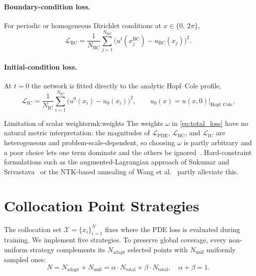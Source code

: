 \paragraph{Boundary-condition loss.}
For periodic or homogeneous Dirichlet conditions at $x \in \{0,\,2\pi\}$,
\[
  \mathcal{L}_\text{BC}
  = \frac{1}{N_\text{BC}}\sum_{j=1}^{N_\text{BC}}
    \bigl(u^t(x_j^\text{BC}) - u_\text{BC}(x_j)\bigr)^2 .
\]

\paragraph{Initial-condition loss.}
At $t=0$ the network is fitted directly to the analytic Hopf--Cole profile,
\[
  \mathcal{L}_\text{IC}
  = \frac{1}{N_\text{IC}}\sum_{i=1}^{N_\text{IC}}
    \bigl(u^0(x_i) - u_0(x_i)\bigr)^2,
  \qquad u_0(x) = u(x,0)\big|_{\text{Hopf--Cole}} .
\]

\begin{Rmk}{Limitation of scalar weights}{rmk:weights}
  The weights $\omega$ in \eqref{eq:total_loss} have no natural metric
  interpretation: the magnitudes of $\mathcal{L}_\text{PDE}$,
  $\mathcal{L}_\text{BC}$, and $\mathcal{L}_\text{IC}$ are heterogeneous and
  problem-scale-dependent, so choosing $\omega$ is partly arbitrary and a poor
  choice lets one term dominate and the others be ignored~\cite{Wang2021}.
  Hard-constraint formulations such as the augmented-Lagrangian approach of
  Sukumar and Srivastava~\cite{Sukumar2022} or the NTK-based annealing of Wang
  et al.~\cite{Wang2021} partly alleviate this.
\end{Rmk}

\section{Collocation Point Strategies}

The collocation set $\mathcal{X} = \{x_i\}_{i=1}^{N}$ fixes where the PDE loss
is evaluated during training. We implement five strategies. To preserve global
coverage, every non-uniform strategy complements its $N_\text{adapt}$ selected
points with $N_\text{unif}$ uniformly sampled ones:
\begin{equation}
  N = N_\text{adapt} + N_\text{unif}
    = \alpha \cdot N_\text{total} + \beta \cdot N_\text{total},
  \quad \alpha + \beta = 1.
  \label{eq:split}
\end{equation}

